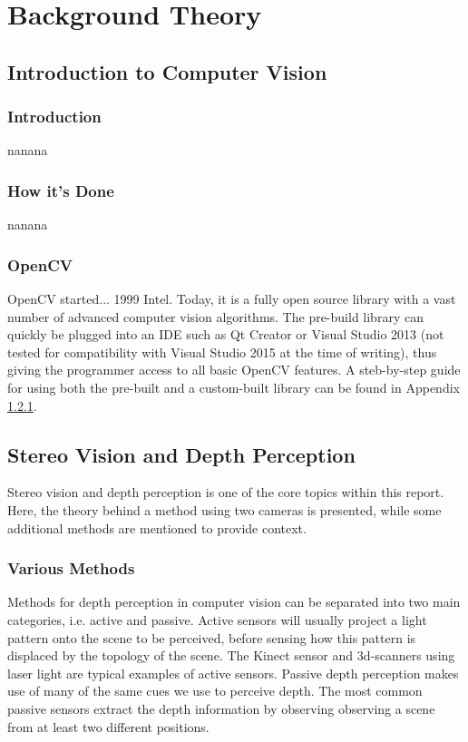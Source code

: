 \chapter{Background Theory}

\section{Introduction to Computer Vision}

\subsection{Introduction}
nanana

\subsection{How it's Done}
nanana

\subsection{OpenCV}

OpenCV started... 1999 Intel. Today, it is a fully open source library with a vast number of advanced computer vision algorithms. The pre-build library can quickly be plugged into  an IDE such as Qt Creator or Visual Studio 2013 (not tested for compatibility with Visual Studio 2015 at the time of writing), thus giving the programmer access to all basic OpenCV features. A steb-by-step guide for using both the pre-built and a custom-built library can be found in Appendix \ref{}.

\section{Stereo Vision and Depth Perception}

Stereo vision and depth perception is one of the core topics within this report. Here, the theory behind a method using two cameras is presented, while some additional methods are mentioned to provide context.

\subsection{Various Methods}

Methods for depth perception in computer vision can be separated into two main categories, i.e. active and passive. Active sensors will usually project a light pattern onto the scene to be perceived, before sensing how this pattern is displaced by the topology of the scene. The Kinect sensor and 3d-scanners using laser light are typical examples of active sensors. Passive depth perception makes use of many of the same cues we use to perceive depth. The most common passive sensors extract the depth information by observing observing a scene from at least two different positions. 

